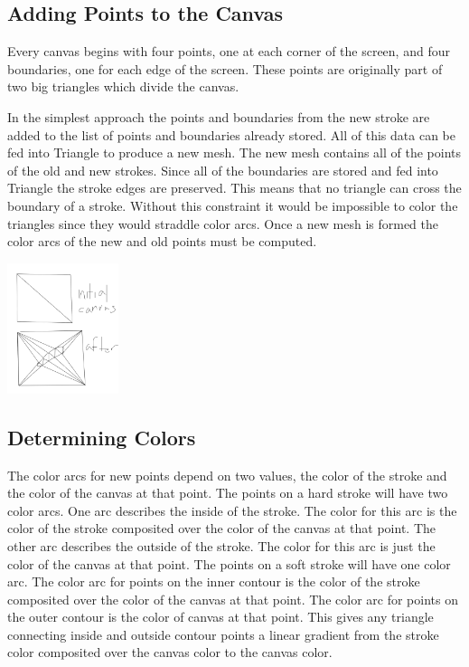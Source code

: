 \documentclass[conference]{acmsiggraph}
\begin{document}
\subsection{Adding Points to the Canvas}

Every canvas begins with four points, one at each corner of the screen, and four boundaries, one
for each edge of the screen. These points are originally part of two big triangles which
divide the canvas.

In the simplest approach the points and boundaries from the new stroke are added
to the list of points and boundaries already stored. All of this data can be fed into Triangle
to produce a new mesh. The new mesh contains all of the points of the old and new strokes. Since
all of the boundaries are stored and fed into Triangle the stroke edges are preserved. This means that
no triangle can cross the boundary of a stroke. Without this constraint it would be impossible to color the
triangles since they would straddle color arcs. Once a new mesh is formed the color arcs of the 
new and old points must be computed.

\includegraphics[height=1.5in]{images/canvastriangulation}

\subsection{Determining Colors}
The color arcs for new points depend on two values, the color of the stroke and the color
of the canvas at that point. The points on a hard stroke will have two color arcs. One
arc describes the inside of the stroke. The color for this arc is the color of the stroke
composited over the color of the canvas at that point. The other arc describes the outside
of the stroke. The color for this arc is just the color of the canvas at that point. The
points on a soft stroke will have one color arc. The color arc for points on the inner
contour is the color of the stroke composited over the color of the canvas at that point.
The color arc for points on the outer contour is the color of canvas at that point.
This gives any triangle connecting inside and outside contour points a linear gradient
from the stroke color composited over the canvas color to the canvas color.
\end{document}
